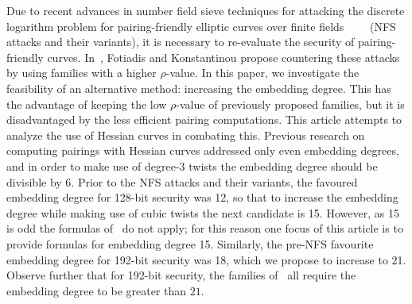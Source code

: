 Due to recent advances in number field sieve techniques for attacking the discrete logarithm problem
for pairing-friendly elliptic curves over finite fields~\cite{2013/jouxP}~\cite{2016/KB}~\cite{2015/BGGM}~\cite{2015/BGK} (NFS attacks and their variants),
it is necessary to re-evaluate the security of pairing-friendly curves.
In~\cite{2018/FK}, Fotiadis and Konstantinou propose countering these attacks by using families with a higher $\rho$-value. 
In this paper, we investigate the feasibility of an alternative method: increasing the embedding degree.
This has the advantage of keeping the low $\rho$-value of previously proposed families, but it is disadvantaged by the less efficient pairing computations.
This article attempts to analyze the use of Hessian curves in combating this.
Previous research on computing pairings with  Hessian curves addressed only even embedding degrees, and in order to make use of degree-3 twists the embedding degree should be divisible by 6. 
Prior to the NFS attacks and their variants, the favoured embedding degree for 128-bit security was 12, 
so that to increase the embedding degree while making use of cubic twists the next
candidate is 15. However, as 15 is odd the formulas of~\cite{2010/Gu} do not apply;
for this reason one focus of this article is to provide formulas for embedding degree 15. Similarly, the pre-NFS favourite embedding degree for 192-bit security was 18, which we propose to increase to 21.
Observe further that for 192-bit security, the families of~\cite{2018/FK} all require the embedding degree to be greater than $21$.



